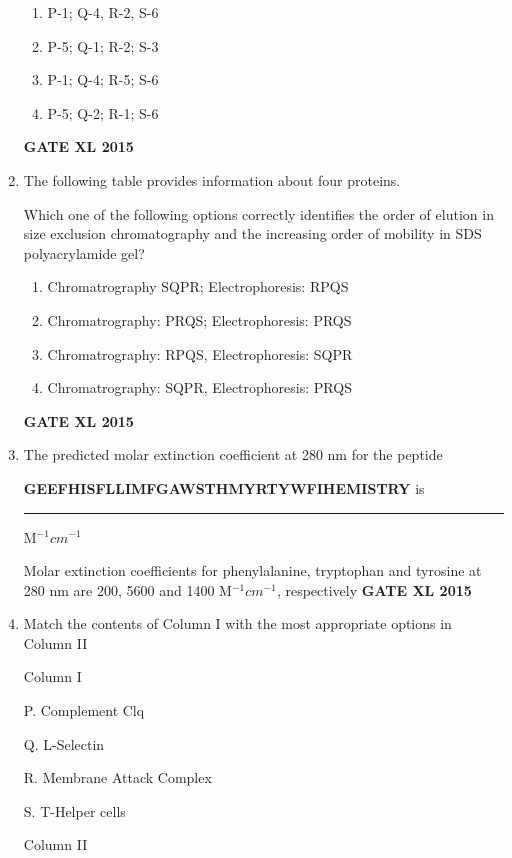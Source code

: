 \documentclass[journal,12pt,onecolumn]{IEEEtran}
\begin{document}
\begin{enumerate}
\begin{minipage}{0.5\textwidth}
\begin{flushleft}
		\end{flushleft}
	\end{minipage}
    \begin{enumerate}
            \item P-1; Q-4, R-2, S-6
	    \item P-5; Q-1; R-2; S-3
	    \item P-1; Q-4; R-5; S-6
            \item P-5; Q-2; R-1; S-6
	\end{enumerate}
\hfill{\textbf{GATE XL 2015}}
\item The following table provides information about four proteins.
\vspace{0.2cm}
\begin{table}[H]

	\caption*{}
	\label{37}
\end{table}
Which one of the following options correctly identifies the order of elution in size exclusion chromatography and the increasing order of mobility in SDS polyacrylamide gel?
    \begin{enumerate}
	    \item Chromatrography SQPR; Electrophoresis: RPQS
	    \item Chromatrography: PRQS; Electrophoresis: PRQS
	    \item Chromatrography: RPQS, Electrophoresis: SQPR
            \item Chromatrography: SQPR, Electrophoresis: PRQS
    \end{enumerate}
\hfill{\textbf{GATE XL 2015}}
\item The predicted molar extinction coefficient at 280 nm for the peptide

	\textbf{GEEFHISFLLIMFGAWSTHMYRTYWFIHEMISTRY} is\rule{1cm}{0.15mm} M$^{-1}cm^{-1}$

Molar extinction coefficients for phenylalanine, tryptophan and tyrosine at 280 nm are 200, 5600 and 1400 M$^{-1}cm^{-1}$, respectively
\hfill{\textbf{GATE XL 2015}}
\item Match the contents of Column I with the most appropriate options in Column II
	

	\begin{minipage}{0.5\textwidth}
		\begin{flushleft}
Column I

P. Complement Clq

Q. L-Selectin

R. Membrane Attack Complex

S. T-Helper cells
		\end{flushleft}
	\end{minipage}
	\begin{minipage}{0.5\textwidth}
		\begin{flushleft}
Column II


\end{flushleft}
\end{minipage}
\end{enumerate}
\end{document}
